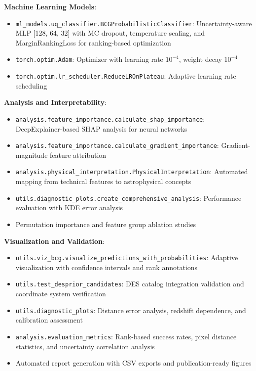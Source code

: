 \documentclass[twocolumn,10pt]{aastex631}
\begin{document}
\textbf{Machine Learning Models}:
\begin{itemize}
\item \texttt{ml\_models.uq\_classifier.BCGProbabilisticClassifier}: Uncertainty-aware MLP [128, 64, 32] with MC dropout, temperature scaling, and MarginRankingLoss for ranking-based optimization
\item \texttt{torch.optim.Adam}: Optimizer with learning rate $10^{-4}$, weight decay $10^{-4}$
\item \texttt{torch.optim.lr\_scheduler.ReduceLROnPlateau}: Adaptive learning rate scheduling
\end{itemize}

\textbf{Analysis and Interpretability}:
\begin{itemize}
\item \texttt{analysis.feature\_importance.calculate\_shap\_importance}: DeepExplainer-based SHAP analysis for neural networks
\item \texttt{analysis.feature\_importance.calculate\_gradient\_importance}: Gradient-magnitude feature attribution
\item \texttt{analysis.physical\_interpretation.PhysicalInterpretation}: Automated mapping from technical features to astrophysical concepts
\item \texttt{utils.diagnostic\_plots.create\_comprehensive\_analysis}: Performance evaluation with KDE error analysis
\item Permutation importance and feature group ablation studies
\end{itemize}

\textbf{Visualization and Validation}:
\begin{itemize}
\item \texttt{utils.viz\_bcg.visualize\_predictions\_with\_probabilities}: Adaptive visualization with confidence intervals and rank annotations
\item \texttt{utils.test\_desprior\_candidates}: DES catalog integration validation and coordinate system verification
\item \texttt{utils.diagnostic\_plots}: Distance error analysis, redshift dependence, and calibration assessment
\item \texttt{analysis.evaluation\_metrics}: Rank-based success rates, pixel distance statistics, and uncertainty correlation analysis
\item Automated report generation with CSV exports and publication-ready figures
\end{itemize}
\end{document}
